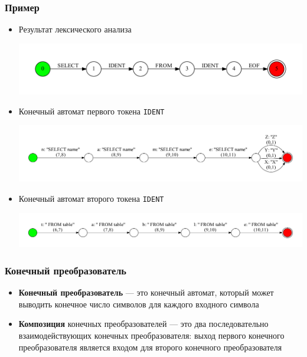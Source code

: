 \documentclass{beamer}
\begin{document}
\begin{frame}[fragile]
\transwipe[direction=90]
\frametitle{Пример}
\begin{itemize}
\item Результат лексического анализа
    \begin{center}
        {\includegraphics[width=1.0\linewidth]{tsql_test_appr}}
    \end{center}
        
\item Конечный автомат первого токена \verb|IDENT|
    \begin{center}
        {\includegraphics[width=1.0\linewidth]{tsql_ident_1}}
    \end{center}

\item Конечный автомат второго токена \verb|IDENT|
    \begin{center}
        {\includegraphics[width=1.0\linewidth]{tsql_ident_2}}
    \end{center}
\end{itemize}
\end{frame}


\begin{frame}[fragile]
\transwipe[direction=90]
\frametitle{Конечный преобразователь}
\begin{itemize}
\item \textbf{Конечный преобразователь} --- это конечный автомат, который может выводить конечное число символов для каждого входного символа

\item \textbf{Композиция} конечных преобразователей --- это два последовательно взаимодействующих конечных преобразователя: выход первого конечного преобразователя является входом для второго конечного преобразователя
\end{itemize}
\end{frame}
\end{document}
